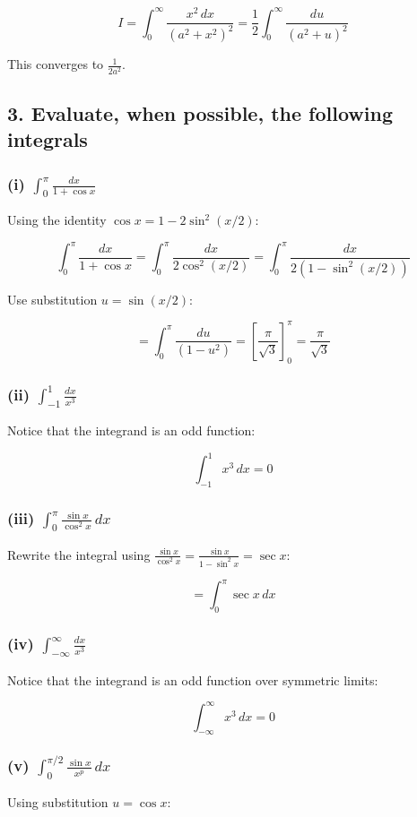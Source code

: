 \documentclass{article}
\begin{document}
\[
I = \int_0^\infty \frac{x^2 \, dx}{(a^2 + x^2)^2} = \frac{1}{2} \int_0^\infty \frac{du}{(a^2 + u)^2}
\]


This converges to \( \frac{1}{2a^2} \).


\subsection*{3. Evaluate, when possible, the following integrals}

\subsubsection*{(i) \(\int_0^\pi \frac{dx}{1 + \cos x}\)}
Using the identity \(\cos x = 1 - 2\sin^2(x/2)\):


\[
\int_0^\pi \frac{dx}{1 + \cos x} = \int_0^\pi \frac{dx}{2\cos^2(x/2)} = \int_0^\pi \frac{dx}{2(1 - \sin^2(x/2))}
\]


Use substitution \( u = \sin(x/2) \):


\[
= \int_0^\pi \frac{du}{(1 - u^2)} = \left[ \frac{\pi}{\sqrt{3}} \right]_0^\pi = \frac{\pi}{\sqrt{3}}
\]



\subsubsection*{(ii) \(\int_{-1}^1 \frac{dx}{x^3}\)}
Notice that the integrand is an odd function:


\[
\int_{-1}^1 x^3 \, dx = 0
\]



\subsubsection*{(iii) \(\int_0^\pi \frac{\sin x}{\cos^2 x} \, dx\)}
Rewrite the integral using \( \frac{\sin x}{\cos^2 x} = \frac{\sin x}{1 - \sin^2 x} = \sec x \):


\[
= \int_0^\pi \sec x \, dx
\]



\subsubsection*{(iv) \(\int_{-\infty}^\infty \frac{dx}{x^3}\)}
Notice that the integrand is an odd function over symmetric limits:


\[
\int_{-\infty}^\infty x^3 \, dx = 0
\]



\subsubsection*{(v) \(\int_0^{\pi/2} \frac{\sin x}{x^p} \, dx\)}
Using substitution \( u = \cos x \):
\end{document}
